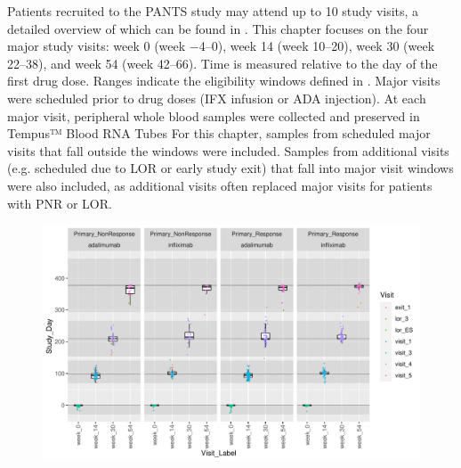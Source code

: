 \begin{outline}
%
%
%
Patients recruited to the \gls{PANTS} study may attend up to 10 study visits, a detailed overview of which can be found in \textcite{kennedy2019PredictorsAntiTNFTreatment}. 
This chapter focuses on the four major study visits: week 0 (week \numrange{-4}{0}), week 14 (week \numrange{10}{20}), week 30 (week \numrange{22}{38}), and week 54 (week \numrange{42}{66}).
Time is measured relative to the day of the first drug dose.
Ranges indicate the eligibility windows defined in \textcite{kennedy2019PredictorsAntiTNFTreatment}.
Major visits were scheduled prior to drug doses (IFX infusion or ADA injection).
At each major visit, peripheral whole blood samples were collected and preserved in Tempus™ Blood RNA Tubes
For this chapter, samples from scheduled major visits that fall outside the windows were included.
Samples from additional visits (e.g. scheduled due to \gls{LOR} or early study exit) that fall into major visit windows were also included, as additional visits often replaced major visits for patients with \gls{PNR} or \gls{LOR}.

\begin{figure}
    \centering
    \includegraphics[width=1.0\textwidth,page=1]{mainmatter/figures/chapter_05/process_pheno.pheno_filtered_dge.Study_Day_vs_Visit_Label.pdf}
    \caption{}
    \label{fig:multipants_studyDay_boxplots}
\end{figure}


\end{outline}
